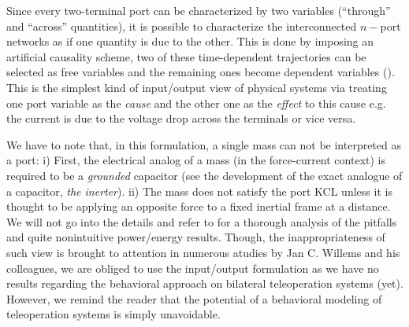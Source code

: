 Since every two-terminal port can be characterized by two variables (``through'' and ``across'' quantities), it is possible to 
characterize the interconnected $n-$port networks as if one quantity is due to the other. This is done by imposing an artificial 
causality scheme, two of these time-dependent trajectories can be selected as free variables and the remaining ones become dependent variables 
(\cite{behavbook}). This is the simplest kind of input/output view of physical systems via treating one port variable as the 
\emph{cause} and the other one as the \emph{effect} to this cause e.g. the current is due to the voltage drop across the terminals or 
vice versa. 


\begin{rem}
We have to note that, in this formulation, a single mass can not be interpreted as a port: i) First, the electrical analog of  
a mass (in the force-current context) is required to be a \emph{grounded} capacitor (see \cite{smith} the development 
of the exact analogue of a capacitor, \emph{the inerter}). ii) The mass does not satisfy the 
port KCL unless it is thought to be applying an opposite force to a fixed inertial frame at a distance. We will not 
go into the details and refer to \cite{willemsCSM} for a thorough analysis of the pitfalls and quite nonintuitive power/energy 
results. Though, the inappropriateness of such view is brought to attention in numerous atudies by Jan C. Willems and his 
colleagues, we are obliged to use the input/output formulation as we have no results regarding the behavioral approach on bilateral 
teleoperation systems (yet). However, we remind the reader that the potential of a behavioral modeling of teleoperation systems
is simply unavoidable. 
\end{rem}

